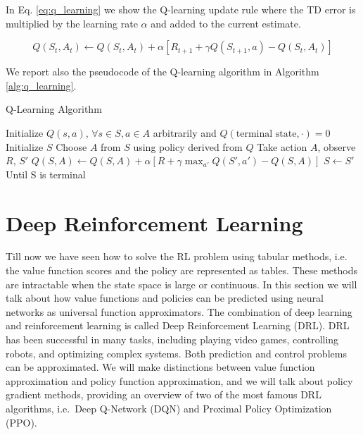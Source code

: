 In Eq. \ref{eq:q_learning} we show the Q-learning update rule where the TD error is multiplied by the learning rate $\alpha$ and added to the current estimate.

\begin{equation} \label{eq:q_learning}
    Q(S_t, A_t) \leftarrow Q(S_t, A_t) + \alpha [R_{t+1} + \gamma Q(S_{t+1}, a) - Q(S_t, A_t)]
\end{equation}

We report also the pseudocode of the Q-learning algorithm in Algorithm \ref{alg:q_learning}.


\begin{algorithm}
\caption{Q-Learning Algorithm}\label{alg:q_learning}
\begin{algorithmic}
\State Initialize $Q(s, a)$,  $\forall s \in S, a \in A$ arbitrarily and $Q(\text{terminal state}, \cdot) = 0$
    \State Initialize $S$
        \State Choose $A$ from $S$ using policy derived from $Q$
        \State Take action $A$, observe $R$, $S'$
        \State $Q(S, A) \leftarrow Q(S, A) + \alpha [R + \gamma \max_{a'} Q(S', a') - Q(S, A)]$
        \State $S \leftarrow S'$
    \EndFor
\State Until S is terminal
\EndFor




\end{algorithmic}
\end{algorithm}



\section{Deep Reinforcement Learning}
\label{sec:drl}
Till now we have seen how to solve the RL problem using tabular methods, i.e. the value function  scores and the policy are represented as tables.
These methods are intractable when the state space is large or continuous.
In this section we will talk about how value functions and policies can be predicted using neural networks as universal function approximators.
The combination of deep learning and reinforcement learning is called Deep Reinforcement Learning (DRL).
DRL has been successful in many tasks, including playing video games, controlling robots, and optimizing complex systems.
Both prediction and control problems can be approximated.
We will make distinctions between value function approximation and policy function approximation, and we will talk about policy gradient methods, providing an overview of two of the most famous DRL algorithms, i.e.\ Deep Q-Network (DQN) and Proximal Policy Optimization (PPO).


